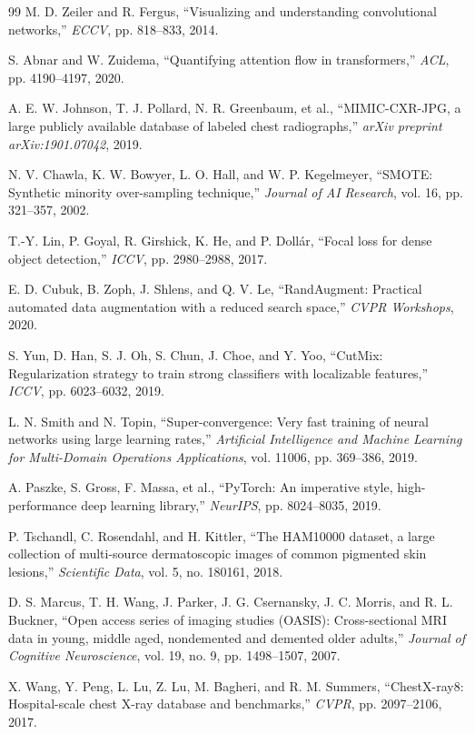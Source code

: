 \documentclass[12pt,a4paper]{report}
\begin{document}
\begin{thebibliography}{99}
M. D. Zeiler and R. Fergus, ``Visualizing and understanding convolutional networks,'' \textit{ECCV}, pp. 818--833, 2014.

S. Abnar and W. Zuidema, ``Quantifying attention flow in transformers,'' \textit{ACL}, pp. 4190--4197, 2020.

A. E. W. Johnson, T. J. Pollard, N. R. Greenbaum, et al., ``MIMIC-CXR-JPG, a large publicly available database of labeled chest radiographs,'' \textit{arXiv preprint arXiv:1901.07042}, 2019.

N. V. Chawla, K. W. Bowyer, L. O. Hall, and W. P. Kegelmeyer, ``SMOTE: Synthetic minority over-sampling technique,'' \textit{Journal of AI Research}, vol. 16, pp. 321--357, 2002.

T.-Y. Lin, P. Goyal, R. Girshick, K. He, and P. Doll\'{a}r, ``Focal loss for dense object detection,'' \textit{ICCV}, pp. 2980--2988, 2017.

E. D. Cubuk, B. Zoph, J. Shlens, and Q. V. Le, ``RandAugment: Practical automated data augmentation with a reduced search space,'' \textit{CVPR Workshops}, 2020.

S. Yun, D. Han, S. J. Oh, S. Chun, J. Choe, and Y. Yoo, ``CutMix: Regularization strategy to train strong classifiers with localizable features,'' \textit{ICCV}, pp. 6023--6032, 2019.

L. N. Smith and N. Topin, ``Super-convergence: Very fast training of neural networks using large learning rates,'' \textit{Artificial Intelligence and Machine Learning for Multi-Domain Operations Applications}, vol. 11006, pp. 369--386, 2019.

A. Paszke, S. Gross, F. Massa, et al., ``PyTorch: An imperative style, high-performance deep learning library,'' \textit{NeurIPS}, pp. 8024--8035, 2019.

P. Tschandl, C. Rosendahl, and H. Kittler, ``The HAM10000 dataset, a large collection of multi-source dermatoscopic images of common pigmented skin lesions,'' \textit{Scientific Data}, vol. 5, no. 180161, 2018.

D. S. Marcus, T. H. Wang, J. Parker, J. G. Csernansky, J. C. Morris, and R. L. Buckner, ``Open access series of imaging studies (OASIS): Cross-sectional MRI data in young, middle aged, nondemented and demented older adults,'' \textit{Journal of Cognitive Neuroscience}, vol. 19, no. 9, pp. 1498--1507, 2007.

X. Wang, Y. Peng, L. Lu, Z. Lu, M. Bagheri, and R. M. Summers, ``ChestX-ray8: Hospital-scale chest X-ray database and benchmarks,'' \textit{CVPR}, pp. 2097--2106, 2017.

\end{thebibliography}
\end{document}
